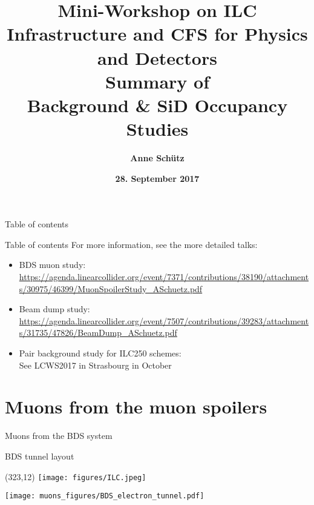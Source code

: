 \documentclass[xcolor={dvipsnames}]{beamer}
\title[ILC backgrounds \& SiD Occupancy]{\textbf{\alert{Mini-Workshop on ILC Infrastructure and CFS for Physics and Detectors} \\ \vspace*{0.3cm} \LARGE  Summary of \\Background \& SiD Occupancy Studies}}
\author{\textbf{Anne Sch\"utz}}
\institute{\textbf{DESY}}
\date{\textbf{28. September 2017}}
\newcommand{\ilclogo}{
  \setlength{\TPHorizModule}{1pt}
  \setlength{\TPVertModule}{1pt}
  \begin{textblock}{1}(323,12)
   \texttt{[image: figures/ILC.jpeg]}
  \end{textblock}
}
\begin{document}
{
\begin{frame}
  \titlepage
\end{frame}
}

\begin{frame}{Table of contents}
  \tableofcontents
\end{frame}
\begin{frame}{Table of contents}
  For more information, see the more detailed talks:
  \begin{itemize}
   \item BDS muon study:\\
   {\small
   \url{https://agenda.linearcollider.org/event/7371/contributions/38190/attachments/30975/46399/MuonSpoilerStudy_ASchuetz.pdf}
   }
   \item Beam dump study:\\
   {\small
   \url{https://agenda.linearcollider.org/event/7507/contributions/39283/attachments/31735/47826/BeamDump_ASchuetz.pdf}
   }
   \item Pair background study for ILC250 schemes:\\
   {\small
   See LCWS2017 in Strasbourg in October
   }
  \end{itemize}
\end{frame}


\section{Muons from the muon spoilers}
\begin{frame}
 \centering \LARGE Muons from the BDS system
\end{frame}

\begin{frame}{BDS tunnel layout}
\ilclogo
\begin{center}
\texttt{[image: muons\_figures/BDS\_electron\_tunnel.pdf]}
\end{center}
\end{frame}
\end{document}
